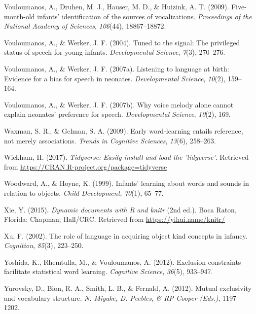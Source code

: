 \documentclass[english,floatsintext,man]{apa6}
\theoremstyle{definition}
\theoremstyle{definition}
\theoremstyle{definition}
\theoremstyle{remark}
\begin{document}
\leavevmode\hypertarget{ref-vouloumanos2009five}{}%
Vouloumanos, A., Druhen, M. J., Hauser, M. D., \& Huizink, A. T. (2009).
Five-month-old infants' identification of the sources of vocalizations.
\emph{Proceedings of the National Academy of Sciences}, \emph{106}(44),
18867--18872.

\leavevmode\hypertarget{ref-vouloumanos2004tuned}{}%
Vouloumanos, A., \& Werker, J. F. (2004). Tuned to the signal: The
privileged status of speech for young infants. \emph{Developmental
Science}, \emph{7}(3), 270--276.

\leavevmode\hypertarget{ref-vouloumanos2007listening}{}%
Vouloumanos, A., \& Werker, J. F. (2007a). Listening to language at
birth: Evidence for a bias for speech in neonates. \emph{Developmental
Science}, \emph{10}(2), 159--164.

\leavevmode\hypertarget{ref-vouloumanos2007voice}{}%
Vouloumanos, A., \& Werker, J. F. (2007b). Why voice melody alone cannot
explain neonates' preference for speech. \emph{Developmental Science},
\emph{10}(2), 169.

\leavevmode\hypertarget{ref-waxman2009early}{}%
Waxman, S. R., \& Gelman, S. A. (2009). Early word-learning entails
reference, not merely associations. \emph{Trends in Cognitive Sciences},
\emph{13}(6), 258--263.

\leavevmode\hypertarget{ref-R-tidyverse}{}%
Wickham, H. (2017). \emph{Tidyverse: Easily install and load the
'tidyverse'}. Retrieved from
\url{https://CRAN.R-project.org/package=tidyverse}

\leavevmode\hypertarget{ref-woodward1999infants}{}%
Woodward, A., \& Hoyne, K. (1999). Infants' learning about words and
sounds in relation to objects. \emph{Child Development}, \emph{70}(1),
65--77.

\leavevmode\hypertarget{ref-R-knitr}{}%
Xie, Y. (2015). \emph{Dynamic documents with R and knitr} (2nd ed.).
Boca Raton, Florida: Chapman; Hall/CRC. Retrieved from
\url{https://yihui.name/knitr/}

\leavevmode\hypertarget{ref-xu2002role}{}%
Xu, F. (2002). The role of language in acquiring object kind concepts in
infancy. \emph{Cognition}, \emph{85}(3), 223--250.

\leavevmode\hypertarget{ref-yoshida2012exclusion}{}%
Yoshida, K., Rhemtulla, M., \& Vouloumanos, A. (2012). Exclusion
constraints facilitate statistical word learning. \emph{Cognitive
Science}, \emph{36}(5), 933--947.

\leavevmode\hypertarget{ref-yurovsky2012mutual}{}%
Yurovsky, D., Bion, R. A., Smith, L. B., \& Fernald, A. (2012). Mutual
exclusivity and vocabulary structure. \emph{N. Miyake, D. Peebles, \& RP
Cooper (Eds.)}, 1197--1202.



\clearpage
\renewcommand{\listfigurename}{Figure captions}
\listoffigures
\end{document}
